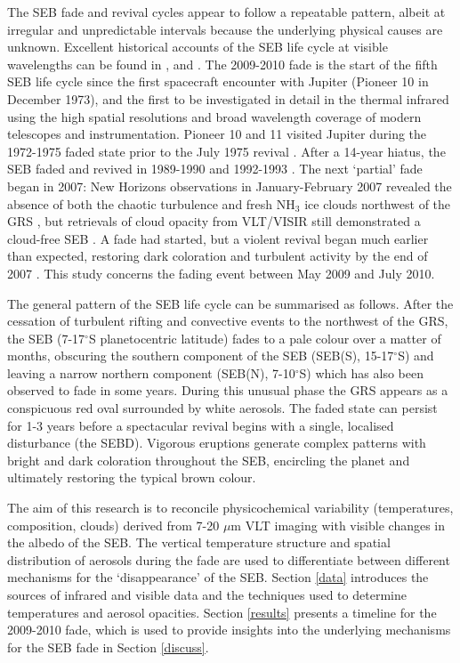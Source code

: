 \documentclass[final,5p,times,twocolumn,authoryear]{elsarticle}
\begin{document}
The SEB fade and revival cycles appear to follow a repeatable pattern, albeit at irregular and unpredictable intervals because the underlying physical causes are unknown.  Excellent historical accounts of the SEB life cycle at visible wavelengths can be found in \citet{58peek}, \citet{95rogers} and \citet{96sanchez_jup}.  The 2009-2010 fade is the start of the fifth SEB life cycle since the first spacecraft encounter with Jupiter (Pioneer 10 in December 1973), and the first to be investigated in detail in the thermal infrared using the high spatial resolutions and broad wavelength coverage of modern telescopes and instrumentation.  Pioneer 10 and 11 visited Jupiter during the 1972-1975 faded state prior to the July 1975 revival \citep{95rogers, 81orton}.  After a 14-year hiatus, the SEB faded and revived in 1989-1990 \citep{92yanamandra, 93kuehn, 94satoh} and 1992-1993 \citep{96sanchez_SEB, 97moreno}.  The next `partial' fade began in 2007:  New Horizons observations in January-February 2007 revealed the absence of both the chaotic turbulence and fresh NH$_3$ ice clouds northwest of the GRS \citep{07reuter, 07baines}, but retrievals of cloud opacity from VLT/VISIR still demonstrated a cloud-free SEB \citep{10fletcher_grs}.   A fade had started, but a violent revival began much earlier than expected, restoring dark coloration and turbulent activity by the end of 2007 \citep{07rogers, 07rogers_climax}.   This study concerns the fading event between May 2009 and July 2010.

The general pattern of the SEB life cycle can be summarised as follows.  After the cessation of turbulent rifting and convective events to the northwest of the GRS, the SEB (7-17$^\circ$S planetocentric latitude) fades to a pale colour over a matter of months, obscuring the southern component of the SEB (SEB(S), 15-17$^\circ$S) and leaving a narrow northern component (SEB(N), 7-10$^\circ$S) which has also been observed to fade in some years.  During this unusual phase the GRS appears as a conspicuous red oval surrounded by white aerosols.  The faded state can persist for 1-3 years before a spectacular revival begins with a single, localised disturbance (the SEBD).  Vigorous eruptions generate complex patterns with bright and dark coloration throughout the SEB, encircling the planet and ultimately restoring the typical brown colour.  

The aim of this research is to reconcile physicochemical variability (temperatures, composition, clouds) derived from 7-20 $\mu$m VLT imaging with visible changes in the albedo of the SEB.  The vertical temperature structure and spatial distribution of aerosols during the fade are used to differentiate between different mechanisms for the `disappearance' of the SEB.  Section \ref{data} introduces the sources of infrared and visible data and the techniques used to determine temperatures and aerosol opacities.  Section \ref{results} presents a timeline for the 2009-2010 fade, which is used to provide insights into the underlying mechanisms for the SEB fade in Section \ref{discuss}.
\end{document}
